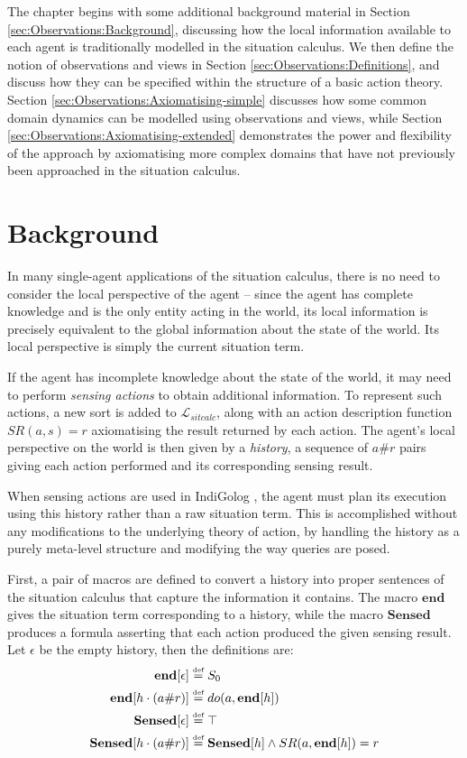 The chapter begins with some additional background material in Section
\ref{sec:Observations:Background}, discussing how the local information
available to each agent is traditionally modelled in the situation
calculus. We then define the notion of observations and views in Section
\ref{sec:Observations:Definitions}, and discuss how they can be specified
within the structure of a basic action theory. Section \ref{sec:Observations:Axiomatising-simple}
discusses how some common domain dynamics can be modelled using observations
and views, while Section \ref{sec:Observations:Axiomatising-extended}
demonstrates the power and flexibility of the approach by axiomatising
more complex domains that have not previously been approached in the
situation calculus.


\section{Background\label{sec:Observations:Background}}

In many single-agent applications of the situation calculus, there
is no need to consider the local perspective of the agent -- since
the agent has complete knowledge and is the only entity acting in
the world, its local information is precisely equivalent to the global
information about the state of the world. Its local perspective is
simply the current situation term.

If the agent has incomplete knowledge about the state of the world,
it may need to perform \emph{sensing actions} to obtain additional
information. To represent such actions, a new sort is
added to $\mathcal{L}_{sitcalc}$, along with an action description
function $SR(a,s)=r$ axiomatising the result returned by each action.
The agent's local perspective on the world is then given by a \emph{history},
a sequence of $a\#r$ pairs giving each action performed and its corresponding
sensing result.

When sensing actions are used in IndiGolog \citep{giacomo99indigolog},
the agent must plan its execution using this history rather than a
raw situation term. This is accomplished without any modifications
to the underlying theory of action, by handling the history as a purely
meta-level structure and modifying the way queries are posed.

First, a pair of macros are defined to convert a history into proper
sentences of the situation calculus that capture the information it
contains. The macro $\mathbf{end}$ gives the situation term corresponding
to a history, while the macro $\mathbf{Sensed}$ produces a formula
asserting that each action produced the given sensing result. Let
$\epsilon$ be the empty history, then the definitions are:\begin{alignat*}{1}
\mathbf{end}[\epsilon] & \stackrel{\mbox{\tiny def}}{=} S_{0}\\
\mathbf{end}[h\cdot(a\#r)] & \stackrel{\mbox{\tiny def}}{=} do(a,\mathbf{end}[h])\\
\mathbf{Sensed}[\epsilon] & \stackrel{\mbox{\tiny def}}{=}\top\\
\mathbf{Sensed}[h\cdot(a\#r)] & \stackrel{\mbox{\tiny def}}{=}\mathbf{Sensed}[h]\wedge SR(a,\mathbf{end}[h])=r\end{alignat*}



